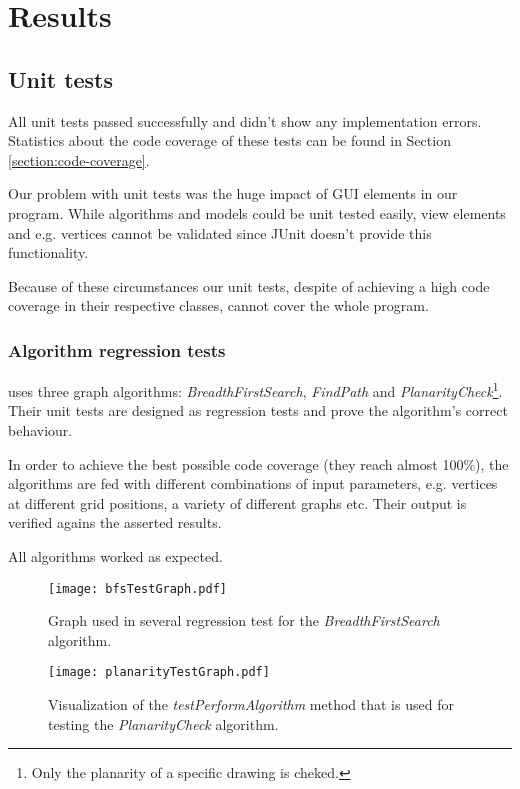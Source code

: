 \section{Results}
\label{section:results}

\subsection{Unit tests}
\label{section:unit-tests}

All unit tests passed successfully and didn't show any implementation errors. Statistics about the code coverage of these tests can be found in Section \ref{section:code-coverage}.\par
Our problem with unit tests was the huge impact of GUI elements in our program. While algorithms and models could be unit tested easily, view elements and e.g. vertices cannot be validated since JUnit doesn't provide this functionality.\par
Because of these circumstances our unit tests, despite of achieving a high code coverage in their respective classes, cannot cover the whole program.\par

\subsubsection{Algorithm regression tests}

\graphioli uses three graph algorithms: \emph{BreadthFirstSearch}, \emph{FindPath} and \emph{PlanarityCheck}\footnote{Only the planarity of a specific drawing is cheked.}. Their unit tests are designed as regression tests and prove the algorithm's correct behaviour.\par
In order to achieve the best possible code coverage (they reach almost 100\%), the algorithms are fed with different combinations of input parameters, e.g. vertices at different grid positions, a variety of different graphs etc. Their output is verified agains the asserted results.\par
All algorithms worked as expected.\par


\begin{figure}[!h]
	\centering
	\texttt{[image: bfsTestGraph.pdf]}
	\caption{Graph used in several regression test for the \emph{BreadthFirstSearch} algorithm.}
	\label{img:bfsTestGraph}
\end{figure}

\begin{figure}[!h]
	\centering
	\texttt{[image: planarityTestGraph.pdf]}
	\caption{Visualization of the \emph{testPerformAlgorithm} method that is used for testing the \emph{PlanarityCheck} algorithm.}
	\label{img:planarityTestGraph}
\end{figure}



